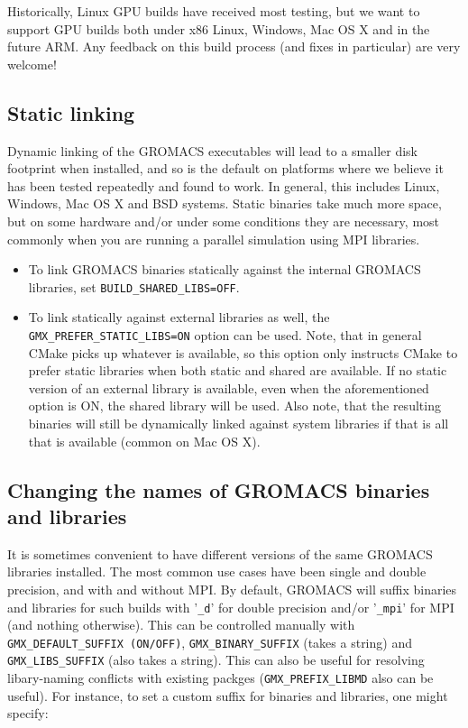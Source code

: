 \documentclass{article}[12pt,a4paper,twoside]
\newcommand{\gromacs}{GROMACS}
\newcommand{\mpi}{MPI}
\newcommand{\cmake}{CMake}
\begin{document}
Historically, Linux GPU builds have received most testing, but we 
want to support GPU builds both under x86 Linux, Windows, Mac OS X and in the
future ARM. Any feedback on this build process (and fixes in particular) are very
welcome!

\subsection{Static linking}
Dynamic linking of the \gromacs{} executables will lead to a
smaller disk footprint when installed, and so is the default on
platforms where we believe it has been tested repeatedly and found to work.
In general, this includes Linux, Windows, Mac OS X and BSD systems.
Static binaries take much more space, but on some hardware and/or under
some conditions they are necessary, most commonly when you are running a parallel
simulation using MPI libraries. 

\begin{itemize}
\item To link \gromacs{} binaries
statically against the internal \gromacs{} libraries, set
\verb+BUILD_SHARED_LIBS=OFF+.
\item To link statically against external
libraries as well, the \verb+GMX_PREFER_STATIC_LIBS=ON+ option can be
used. Note, that in general \cmake{} picks up whatever is available,
so this option only instructs \cmake{} to prefer static libraries when
both static and shared are available. If no static version of an
external library is available, even when the aforementioned option is
ON, the shared library will be used. Also note, that the resulting
binaries will still be dynamically linked against system libraries if
that is all that is available (common on Mac OS X).
\end{itemize}

\subsection{Changing the names of GROMACS binaries and libraries}
It is sometimes convenient to have different versions of the same
\gromacs{} libraries installed. The most common use cases have been
single and double precision, and with and without \mpi{}. By default,
\gromacs{} will suffix binaries and libraries for such builds with
'\verb+_d+' for double precision and/or '\verb+_mpi+' for \mpi{} (and
nothing otherwise). This can be controlled manually with
\verb+GMX_DEFAULT_SUFFIX (ON/OFF)+, \verb+GMX_BINARY_SUFFIX+ (takes 
a string) and \verb+GMX_LIBS_SUFFIX+ (also takes a string). 
This can also be useful for resolving libary-naming conflicts with 
existing packges (\verb+GMX_PREFIX_LIBMD+ also can be useful).
For instance, to set a custom suffix for binaries and libraries, 
one might specify:
\end{document}
